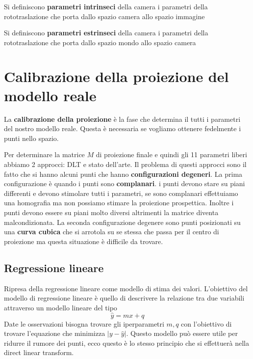 \begin{definizione}
    Si definiscono \textbf{parametri intrinseci} della camera i parametri della rototraslazione 
    che porta dallo spazio camera allo spazio immagine
\end{definizione}

\begin{definizione}
    Si definiscono \textbf{parametri estrinseci} della camera i parametri della rototraslazione 
    che porta dallo spazio mondo allo spazio camera
\end{definizione}

\section{Calibrazione della proiezione del modello reale}
La \textbf{calibrazione della proiezione} è la fase che determina il tutti i 
parametri del nostro modello reale. Questa è necessaria se vogliamo ottenere fedelmente 
i punti nello spazio.


Per determinare la matrice $M$ di proiezione finale e quindi gli 11 parametri liberi 
abbiamo 2 approcci: DLT e stato dell'arte. Il problema di questi approcci sono 
il fatto che si hanno alcuni punti che hanno \textbf{configurazioni degeneri}. 
La prima configurazione è quando i punti sono \textbf{complanari}. i punti 
devono stare su piani differenti e devono stimolare 
tutti i parametri, se sono complanari effettuiamo una homografia ma non possiamo 
stimare la proiezione prospettica. Inoltre i punti devono essere su piani molto 
diversi altrimenti la matrice diventa malcondizionata.
La seconda configurazione degenere sono punti posizionati su una \textbf{curva cubica} 
che si arrotola su se stessa che 
passa per il centro di proiezione ma questa situazione è difficile da trovare.


\subsection{Regressione lineare}
Ripresa della regressione lineare come modello di stima dei valori.
L'obiettivo del modello di regressione lineare è quello di descrivere la relazione 
tra due variabili attraverso un modello lineare del tipo 
$$\hat{y} = mx + q$$
Date le osservazioni bisogna trovare gli iperparametri $m, q$ con l'obiettivo 
di trovare l'equazione che minimizza $|y - \hat{y}|$. Questo modello può essere utile 
per ridurre il rumore dei punti, ecco questo è lo stesso principio che si effettuerà 
nella direct linear transform. 

